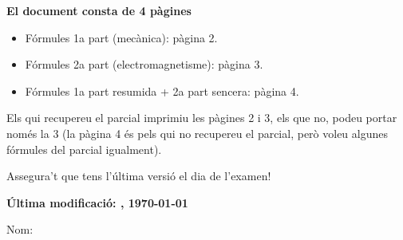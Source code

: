 \documentclass[12pt,a4paper]{article}
\begin{document}
\vspace*{\fill}
\begin{center}
     \Huge {\bf El document consta de 4 pàgines}
\end{center}

\quad

{\Large 
    \begin{addmargin}[10em]{0em}
        \begin{itemize}
            \item Fórmules 1a part (mecànica): pàgina 2.
            \item Fórmules 2a part (electromagnetisme): pàgina 3.
            \item Fórmules 1a part resumida + 2a part sencera: pàgina 4.
        \end{itemize}
    \end{addmargin}
    
    \quad
    
    \begin{addmargin}[8em]{8em}
    Els qui recupereu el parcial imprimiu les pàgines 2 i 3, els que no, podeu portar només la 3 (la pàgina 4 és pels qui no recupereu el parcial, però voleu algunes fórmules del parcial igualment).
    
    \quad
    
    Assegura't que tens l'última versió el dia de l'examen!
    
    \quad
    
    \begin{flushright}
        {\bf Última modificació: \currenttime, \today}
    \end{flushright}
    
    \end{addmargin}
}
\vspace*{\fill}

\newpage

\raggedright
\begin{multicols}{4}
{\fontsize{12}{12}\selectfont
}
\newpage
\end{multicols}

\begin{multicols}{3}


\vspace{15pt}
\raggedleft
{\Large Nom: \underline{\hspace{6cm}}}
\end{multicols}


\end{document}
